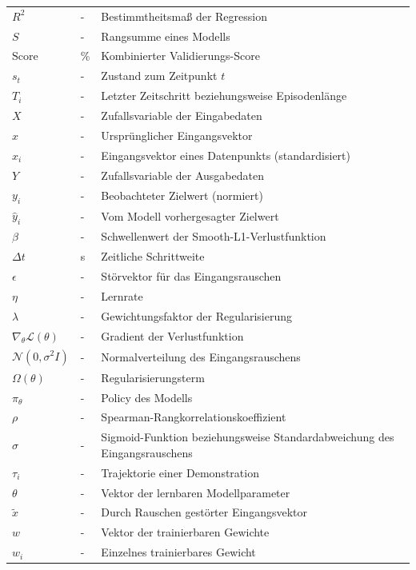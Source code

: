\begin{longtable}{@{} >{\raggedright\arraybackslash}p{4.0cm} >{\raggedright\arraybackslash}p{2.5cm} >{\raggedright\arraybackslash}p{9.5cm} @{}}
        $R^2$ & - & Bestimmtheitsma\ss{} der Regression \\
        $S$ & - & Rangsumme eines Modells \\
        $\mathrm{Score}$ & \% & Kombinierter Validierungs-Score \\
        $s_t$ & - & Zustand zum Zeitpunkt $t$ \\
        $T_i$ & - & Letzter Zeitschritt beziehungsweise Episodenl\"ange \\
        $X$ & - & Zufallsvariable der Eingabedaten \\
        $x$ & - & Urspr\"unglicher Eingangsvektor \\
        $x_i$ & - & Eingangsvektor eines Datenpunkts (standardisiert) \\
        $Y$ & - & Zufallsvariable der Ausgabedaten \\
        $y_i$ & - & Beobachteter Zielwert (normiert) \\
        $\hat{y}_i$ & - & Vom Modell vorhergesagter Zielwert \\
        $\beta$ & - & Schwellenwert der Smooth-L1-Verlustfunktion \\
        $\Delta t$ & s & Zeitliche Schrittweite \\
        $\epsilon$ & - & St\"orvektor f\"ur das Eingangsrauschen \\
        $\eta$ & - & Lernrate \\
        $\lambda$ & - & Gewichtungsfaktor der Regularisierung \\
        $\nabla_\theta \mathcal{L}(\theta)$ & - & Gradient der Verlustfunktion\\
        $\mathcal{N}(0,\sigma^2 I)$ & - & Normalverteilung des Eingangsrauschens \\
        $\Omega(\theta)$ & - & Regularisierungsterm \\
        $\pi_\theta$ & - & Policy des Modells \\
        $\rho$ & - & Spearman-Rangkorrelationskoeffizient \\
        $\sigma$ & - & Sigmoid-Funktion beziehungsweise Standardabweichung des Eingangsrauschens \\
        $\tau_i$ & - & Trajektorie einer Demonstration \\
        $\theta$ & - & Vektor der lernbaren Modellparameter \\
        $\tilde{x}$ & - & Durch Rauschen gest\"orter Eingangsvektor \\
        $w$ & - & Vektor der trainierbaren Gewichte \\
        $w_i$ & - & Einzelnes trainierbares Gewicht \\ \hline
    \end{longtable}
\endgroup